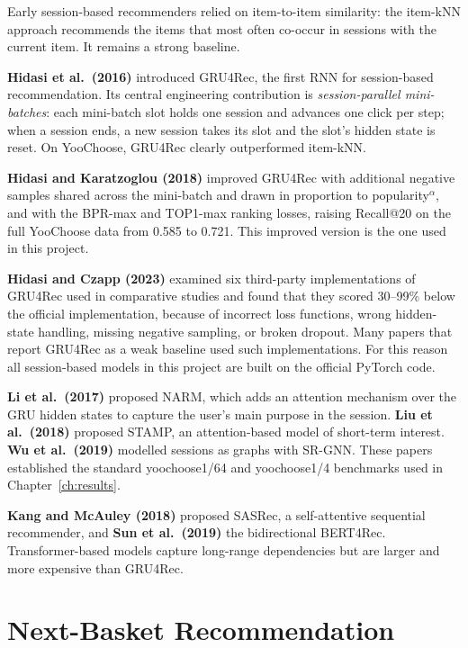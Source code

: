 \documentclass[12pt,a4paper]{report}
\begin{document}
Early session-based recommenders relied on item-to-item similarity: the item-kNN
approach recommends the items that most often co-occur in sessions with the
current item. It remains a strong baseline.

\textbf{Hidasi et al.\ (2016)} \cite{hidasi2016} introduced GRU4Rec, the first
RNN for session-based recommendation. Its central engineering contribution is
\emph{session-parallel mini-batches}: each mini-batch slot holds one session and
advances one click per step; when a session ends, a new session takes its slot
and the slot's hidden state is reset. On YooChoose, GRU4Rec clearly outperformed
item-kNN.

\textbf{Hidasi and Karatzoglou (2018)} \cite{hidasi2018} improved GRU4Rec with
additional negative samples shared across the mini-batch and drawn in proportion
to popularity$^\alpha$, and with the BPR-max and TOP1-max ranking losses, raising
Recall@20 on the full YooChoose data from 0.585 to 0.721. This improved version
is the one used in this project.

\textbf{Hidasi and Czapp (2023)} \cite{hidasi2023} examined six third-party
implementations of GRU4Rec used in comparative studies and found that they
scored 30--99\% below the official implementation, because of incorrect loss
functions, wrong hidden-state handling, missing negative sampling, or broken
dropout. Many papers that report GRU4Rec as a weak baseline used such
implementations. For this reason all session-based models in this project are
built on the official PyTorch code.

\textbf{Li et al.\ (2017)} \cite{li2017} proposed NARM, which adds an attention
mechanism over the GRU hidden states to capture the user's main purpose in the
session. \textbf{Liu et al.\ (2018)} \cite{liu2018} proposed STAMP, an
attention-based model of short-term interest. \textbf{Wu et al.\ (2019)}
\cite{wu2019} modelled sessions as graphs with SR-GNN. These papers established
the standard yoochoose1/64 and yoochoose1/4 benchmarks used in
Chapter~\ref{ch:results}.

\textbf{Kang and McAuley (2018)} \cite{kang2018} proposed SASRec, a
self-attentive sequential recommender, and \textbf{Sun et al.\ (2019)}
\cite{sun2019} the bidirectional BERT4Rec. Transformer-based models capture
long-range dependencies but are larger and more expensive than GRU4Rec.

\section{Next-Basket Recommendation}
\end{document}
